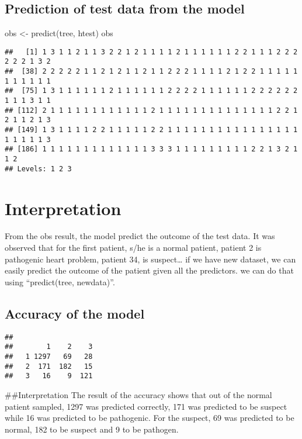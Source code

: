\documentclass[
]{article}
\newenvironment{Shaded}{\begin{snugshade}}{\end{snugshade}}
\newcommand{\FunctionTok}[1]{\textcolor[rgb]{0.00,0.00,0.00}{#1}}
\newcommand{\NormalTok}[1]{#1}
\newcommand{\OtherTok}[1]{\textcolor[rgb]{0.56,0.35,0.01}{#1}}
\newcommand{\SpecialCharTok}[1]{\textcolor[rgb]{0.00,0.00,0.00}{#1}}
\begin{document}
\hypertarget{prediction-of-test-data-from-the-model}{%
\subsection{Prediction of test data from the
model}\label{prediction-of-test-data-from-the-model}}

\begin{Shaded}
\begin{Highlighting}[]
\NormalTok{obs }\OtherTok{\textless{}{-}} \FunctionTok{predict}\NormalTok{(tree, htest)}
\NormalTok{obs}
\end{Highlighting}
\end{Shaded}

\begin{verbatim}
##   [1] 1 3 1 1 2 1 1 3 2 2 1 2 1 1 1 1 2 1 1 1 1 1 1 2 2 1 1 1 2 2 2 2 2 2 1 3 2
##  [38] 2 2 2 2 2 1 1 2 1 2 1 1 2 1 1 2 2 2 1 1 1 1 2 1 2 2 1 1 1 1 1 1 1 1 1 1 1
##  [75] 1 3 1 1 1 1 1 1 2 1 1 1 1 1 1 2 2 2 2 1 1 1 1 1 1 2 2 2 2 2 2 1 1 1 3 1 1
## [112] 2 1 1 1 1 1 1 1 1 1 1 1 1 2 1 1 1 1 1 1 1 1 1 1 1 1 1 1 2 2 1 2 1 1 2 1 3
## [149] 1 3 1 1 1 1 2 2 1 1 1 1 1 2 2 1 1 1 1 1 1 1 1 1 1 1 1 1 1 1 1 1 1 1 1 1 3
## [186] 1 1 1 1 1 1 1 1 1 1 1 1 1 3 3 3 1 1 1 1 1 1 1 1 1 2 2 1 3 2 1 1 2
## Levels: 1 2 3
\end{verbatim}

\hypertarget{interpretation}{%
\section{Interpretation}\label{interpretation}}

From the obs result, the model predict the outcome of the test data. It
was observed that for the first patient, s/he is a normal patient,
patient 2 is pathogenic heart problem, patient 34, is suspect\ldots{} if
we have new dataset, we can easily predict the outcome of the patient
given all the predictors. we can do that using ``predict(tree,
newdata)''.

\hypertarget{accuracy-of-the-model}{%
\subsection{Accuracy of the model}\label{accuracy-of-the-model}}

\begin{Shaded}
\end{Shaded}

\begin{verbatim}
##    
##        1    2    3
##   1 1297   69   28
##   2  171  182   15
##   3   16    9  121
\end{verbatim}

\#\#Interpretation The result of the accuracy shows that out of the
normal patient sampled, 1297 was predicted correctly, 171 was predicted
to be suspect while 16 was predicted to be pathogenic. For the suspect,
69 was predicted to be normal, 182 to be suspect and 9 to be pathogen.
\end{document}
